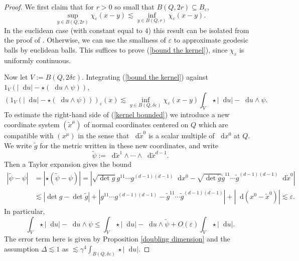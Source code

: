 \documentclass[reqno,12pt,letterpaper]{amsart}
\newcommand*\dif{\mathop{}\!\mathrm{d}}
\theoremstyle{definition}
\numberwithin{equation}{section}
\begin{document}
\begin{proof}
We first claim that for $r > 0$ so small that $B(Q, 2r) \subseteq B_\varepsilon$,
\begin{equation}\label{bound the kernel}
\sup_{y \in B(Q, 2r)} \chi_\varepsilon(x - y) \lesssim \inf_{y \in B(Q, r)} \chi_\varepsilon(x - y).
\end{equation}
In the euclidean case (with constant equal to $4$) this result can be isolated from the proof of \cite[Theorem 7.3]{Giusti77}.
Otherwise, we can use the smallness of $\varepsilon$ to approximate geodesic balls by euclidean balls.
This suffices to prove (\ref{bound the kernel}), since $\chi_\varepsilon$ is uniformly continuous.

Now let $V := B(Q, 2\delta\varepsilon)$.
Integrating (\ref{bound the kernel}) against $1_V(|\dif u| - \star(\dif u \wedge \psi))$,
\begin{equation}\label{kernel bounded}
(1_V(|\dif u| - \star(\dif u \wedge \psi)))_\varepsilon(x) \lesssim \inf_{y \in B(Q, \delta\varepsilon)} \chi_\varepsilon(x - y) \int_V \star |\dif u| - \dif u \wedge \psi.
\end{equation}
To estimate the right-hand side of (\ref{kernel bounded}) we introduce a new coordinate system $(\tilde x^\mu)$ of normal coordinates centered on $Q$ which are compatible with $(x^\mu)$ in the sense that $\dif \tilde x^0$ is a scalar multiple of $\dif x^0$ at $Q$.
We write $\tilde g$ for the metric written in these new coordinates, and write
$$\tilde \psi := \dif \tilde x^1 \wedge \cdots \wedge \dif \tilde x^{d - 1}.$$
Then a Taylor expansion gives the bound
\begin{align}
|\tilde \psi - \psi| &= |\star(\tilde \psi - \psi)| = |\sqrt{\det g} g^{11} \cdots g^{(d-1)(d-1)} \dif x^0 - \sqrt{\det \tilde g} \tilde g^{11} \cdots \tilde g^{(d-1)(d-1)} \dif \tilde x^0|\\
&\lesssim |\det g - \det \tilde g| + |g^{11} \cdots g^{(d-1)(d-1)} - \tilde g^{11} \cdots \tilde g^{(d-1)(d-1)}| + |\dif(x^0 - \tilde x^0)| \lesssim \varepsilon. \label{T vs Ttilde}
\end{align}
In particular,
\begin{equation}\label{split up T Ttilde}
\int_V \star |\dif u| - \dif u \wedge \psi \leq \int_V \star |\dif u| - \dif u \wedge \tilde \psi + O(\varepsilon) \int_V \star |\dif u|.
\end{equation}
The error term here is given by Proposition \ref{doubling dimension} and the assumption $\Delta \lesssim 1$ as $\lesssim \gamma^4 \int_{B(Q, \delta\varepsilon)} \star |\dif u|$.

\end{proof}
\end{document}
